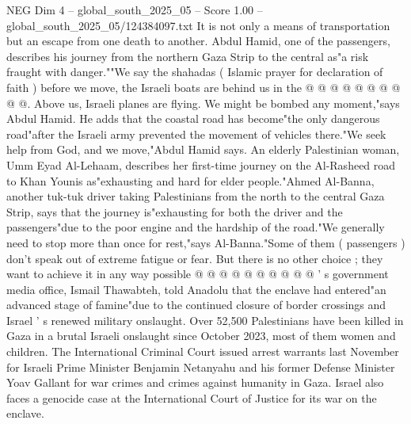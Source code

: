 \begin{textsample}{NEG Dim 4 – global\_south\_2025\_05 – Score 1.00 – global\_south\_2025\_05/124384097.txt}
It is not only a means of transportation but an escape from one death to another.
Abdul Hamid, one of the passengers, describes his journey from the northern Gaza Strip to the central as"a risk fraught with danger.""We say the shahadas ( Islamic prayer for declaration of faith ) before we move, the Israeli boats are behind us in the @ @ @ @ @ @ @ @ @ @.
Above us, Israeli planes are flying.
We might be bombed any moment,"says Abdul Hamid.
He adds that the coastal road has become"the only dangerous road"after the Israeli army prevented the movement of vehicles there."We seek help from God, and we move,"Abdul Hamid says.
An elderly Palestinian woman, Umm Eyad Al-Lehaam, describes her first-time journey on the Al-Rasheed road to Khan Younis as"exhausting and hard for elder people."Ahmed Al-Banna, another tuk-tuk driver taking Palestinians from the north to the central Gaza Strip, says that the journey is"exhausting for both the driver and the passengers"due to the poor engine and the hardship of the road."We generally need to stop more than once for rest,"says Al-Banna."Some of them ( passengers ) don't speak out of extreme fatigue or fear.
But there is no other choice ; they want to achieve it in any way possible @ @ @ @ @ @ @ @ @ @ ' s government media office, Ismail Thawabteh, told Anadolu that the enclave had entered"an advanced stage of famine"due to the continued closure of border crossings and Israel ' s renewed military onslaught.
Over 52,500 Palestinians have been killed in Gaza in a brutal Israeli onslaught since October 2023, most of them women and children.
The International Criminal Court issued arrest warrants last November for Israeli Prime Minister Benjamin Netanyahu and his former Defense Minister Yoav Gallant for war crimes and crimes against humanity in Gaza.
Israel also faces a genocide case at the International Court of Justice for its war on the enclave.

\end{textsample}
